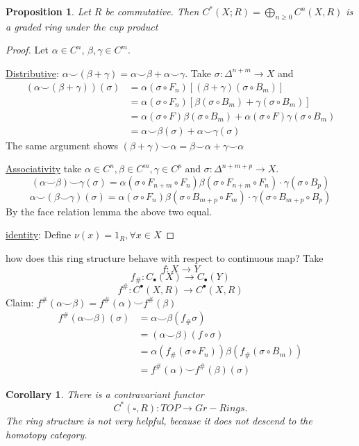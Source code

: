 \documentclass[11pt]{article}
\newtheorem{prop}[thm]{Proposition}
\newtheorem{cor}[thm]{Corollary}
\newcommand{\lrta}{\longrightarrow}
\begin{document}
\begin{prop}
Let $R$ be commutative. Then $C^*(X;R)=\bigoplus_{n\geq 0}C^n(X,R)$ is a graded ring under the cup product
\end{prop}
\begin{proof}
Let $\alpha\in C^n$, $\beta,\gamma\in  C^m$.

\underline{Distributive}: $\alpha\smile(\beta+\gamma)=\alpha\smile \beta+\alpha\smile\gamma$. Take $\sigma: \Delta^{n+m}\lrta X$ and
$$
\begin{aligned}
(\alpha\smile(\beta+\gamma))(\sigma)&=\alpha(\sigma\circ F_n)[(\beta+\gamma)(\sigma\circ B_m)]\\
&=\alpha(\sigma\circ F_n)[\beta(\sigma\circ B_m)+\gamma(\sigma\circ B_m)]\\
&=\alpha(\sigma\circ F)\beta(\sigma\circ B_m)+\alpha(\sigma\circ F)\gamma(\sigma\circ B_m)\\
&=\alpha\smile\beta(\sigma)+\alpha\smile \gamma(\sigma)
\end{aligned}$$
The same argument shows $(\beta+\gamma)\smile \alpha=\beta\smile\alpha+\gamma\smile\alpha$

\underline{Associativity} take $\alpha\in C^n,\beta\in C^m,\gamma\in C^p$ and $\sigma:\Delta^{n+m+p}\lrta X$.
$$
(\alpha\smile \beta)\smile \gamma(\sigma)=\alpha(\sigma\circ F_{n+m}\circ F_n)\beta(\sigma\circ F_{n+m}\circ F_{n})\cdot\gamma(\sigma\circ B_p)
$$
$$
\alpha\smile (\beta\smile \gamma)( \sigma)=\alpha(\sigma\circ  F_n)\beta(\sigma\circ B_{m+p}\circ F_{m})\cdot\gamma(\sigma\circ B_{m+p}\circ B_p)
$$
By the face relation lemma the above two equal.

\underline{identity}: Define $\nu(x)=1_R,\forall x\in X$
\end{proof}

how does this ring structure behave with respect to continuous map? Take
$$
f:X\lrta Y
$$
$$f_\#:C_\bullet(X)\lrta C_\bullet(Y)$$
$$
f^\#:C^\bullet(X,R)\lrta C^\bullet(X,R)
$$
Claim: $f^\#(\alpha\smile \beta)=f^\#(\alpha)\smile f^\#(\beta)$
$$
\begin{aligned}
f^\#(\alpha\smile \beta)(\sigma)&=\alpha\smile \beta(f_\#\sigma)\\
&=(\alpha\smile \beta)(f\circ \sigma)\\
&=\alpha(f_\#(\sigma\circ F_n))\beta(f_\#(\sigma\circ B_m))\\
&=f^\#(\alpha)\smile f^\#(\beta)(\sigma)
\end{aligned}
$$
\begin{cor}
There is a contravariant functor
$$
C^*(\square,R): TOP\lrta Gr-Rings.
$$
The ring structure is not very helpful, because it does not descend to the homotopy category.
\end{cor}
\end{document}
